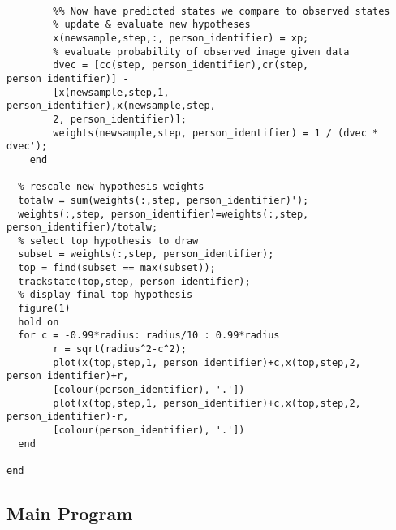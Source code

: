 \documentclass{article}
\begin{document}
\begin{lstlisting}
    
        %% Now have predicted states we compare to observed states
        % update & evaluate new hypotheses
        x(newsample,step,:, person_identifier) = xp;
        % evaluate probability of observed image given data
        dvec = [cc(step, person_identifier),cr(step, person_identifier)] - 
        [x(newsample,step,1,         person_identifier),x(newsample,step,
        2, person_identifier)];
        weights(newsample,step, person_identifier) = 1 / (dvec * dvec'); 
    end
 
  % rescale new hypothesis weights
  totalw = sum(weights(:,step, person_identifier)'); 
  weights(:,step, person_identifier)=weights(:,step, person_identifier)/totalw;
  % select top hypothesis to draw
  subset = weights(:,step, person_identifier);
  top = find(subset == max(subset));
  trackstate(top,step, person_identifier);
  % display final top hypothesis
  figure(1)
  hold on
  for c = -0.99*radius: radius/10 : 0.99*radius 
        r = sqrt(radius^2-c^2);
        plot(x(top,step,1, person_identifier)+c,x(top,step,2, person_identifier)+r,
        [colour(person_identifier), '.'])
        plot(x(top,step,1, person_identifier)+c,x(top,step,2, person_identifier)-r,
        [colour(person_identifier), '.'])
  end
  
end
\end{lstlisting}

\subsection{Main Program}

\end{document}
